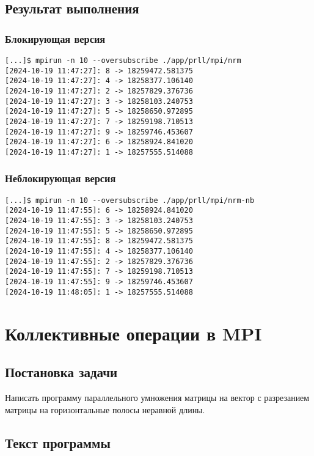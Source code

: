 \documentclass[12pt, a4paper]{article}
\begin{document}
\subsection{Результат выполнения}
\subsubsection{Блокирующая версия}

\begin{verbatim}
[...]$ mpirun -n 10 --oversubscribe ./app/prll/mpi/nrm
[2024-10-19 11:47:27]: 8 -> 18259472.581375
[2024-10-19 11:47:27]: 4 -> 18258377.106140
[2024-10-19 11:47:27]: 2 -> 18257829.376736
[2024-10-19 11:47:27]: 3 -> 18258103.240753
[2024-10-19 11:47:27]: 5 -> 18258650.972895
[2024-10-19 11:47:27]: 7 -> 18259198.710513
[2024-10-19 11:47:27]: 9 -> 18259746.453607
[2024-10-19 11:47:27]: 6 -> 18258924.841020
[2024-10-19 11:47:27]: 1 -> 18257555.514088
\end{verbatim}

\subsubsection{Неблокирующая версия}

\begin{verbatim}
[...]$ mpirun -n 10 --oversubscribe ./app/prll/mpi/nrm-nb
[2024-10-19 11:47:55]: 6 -> 18258924.841020
[2024-10-19 11:47:55]: 3 -> 18258103.240753
[2024-10-19 11:47:55]: 5 -> 18258650.972895
[2024-10-19 11:47:55]: 8 -> 18259472.581375
[2024-10-19 11:47:55]: 4 -> 18258377.106140
[2024-10-19 11:47:55]: 2 -> 18257829.376736
[2024-10-19 11:47:55]: 7 -> 18259198.710513
[2024-10-19 11:47:55]: 9 -> 18259746.453607
[2024-10-19 11:48:05]: 1 -> 18257555.514088
\end{verbatim}

\newpage

\section{Коллективные операции в MPI}
\subsection{Постановка задачи}

Написать программу параллельного умножения матрицы на вектор с разрезанием матрицы на горизонтальные полосы неравной длины.

\subsection{Текст программы}
\end{document}
